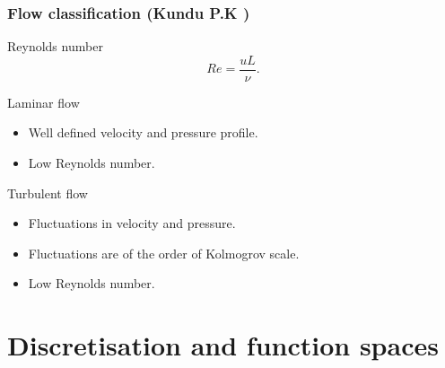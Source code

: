 \documentclass{beamer}
\begin{document}
\begin{frame}
\frametitle{Flow classification (Kundu P.K \cite{Kundu})}
\begin{block}{Reynolds number}
\begin{equation} \label{reynolds_number}
Re =  \frac{uL}{\nu} \textrm{.}
\end{equation}
\end{block}
\begin{block}{Laminar flow}
\begin{itemize}
\item Well defined velocity and pressure profile.
\item Low Reynolds number.
\end{itemize}
\end{block}
\begin{block}{Turbulent flow}
\begin{itemize}
\item Fluctuations in velocity and pressure.
\item Fluctuations are of the order of Kolmogrov scale.
\item Low Reynolds number.
\end{itemize}
\end{block}
\end{frame}


\section{Discretisation and function spaces} %
\end{document}
